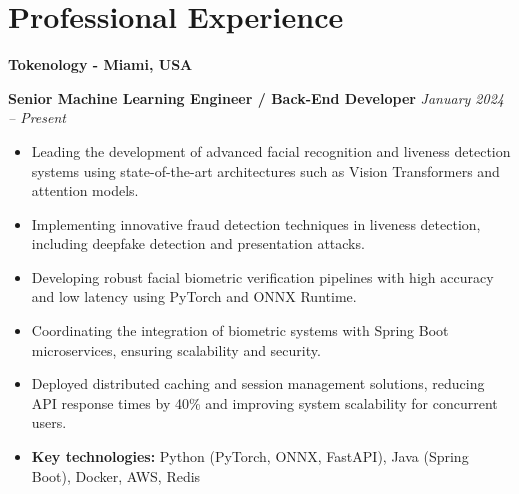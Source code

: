 \documentclass[12pt,a4paper,sans]{moderncv}        %
\begin{document}






\vspace{12pt}
\section{Professional Experience}

\vspace{3pt}

\vspace{24pt}
\small{\textbf{Tokenology - Miami, USA}}
\vspace{3pt}

\textbf{Senior Machine Learning Engineer / Back-End Developer} \hfill \textit{January 2024 -- Present}
\begin{itemize}
    \item Leading the development of advanced facial recognition and liveness detection systems using state-of-the-art architectures such as Vision Transformers and attention models.
    \item Implementing innovative fraud detection techniques in liveness detection, including deepfake detection and presentation attacks.
    \item Developing robust facial biometric verification pipelines with high accuracy and low latency using PyTorch and ONNX Runtime.
    \item Coordinating the integration of biometric systems with Spring Boot microservices, ensuring scalability and security.
    \item Deployed distributed caching and session management solutions, reducing API response times by 40\% and improving system scalability for concurrent users.
    \item \textbf{Key technologies:} Python (PyTorch, ONNX, FastAPI), Java (Spring Boot), Docker, AWS, Redis
\end{itemize}
\end{document}
